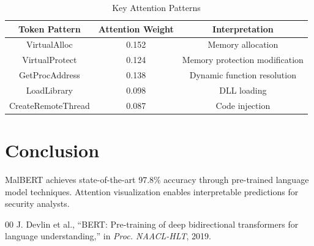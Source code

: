 \documentclass[conference]{IEEEtran}
\begin{document}
\begin{table}[htbp]
\caption{Key Attention Patterns}
\begin{center}
\begin{tabular}{|c|c|c|}
\hline
\textbf{Token Pattern} & \textbf{Attention Weight} & \textbf{Interpretation} \\
\hline
VirtualAlloc & 0.152 & Memory allocation \\
VirtualProtect & 0.124 & Memory protection modification \\
GetProcAddress & 0.138 & Dynamic function resolution \\
LoadLibrary & 0.098 & DLL loading \\
CreateRemoteThread & 0.087 & Code injection \\
\hline
\end{tabular}
\label{tab:attention}
\end{center}
\end{table}

\section{Conclusion}

MalBERT achieves state-of-the-art 97.8\% accuracy through pre-trained language model techniques. Attention visualization enables interpretable predictions for security analysts.

\begin{thebibliography}{00}
 J. Devlin et al., ``BERT: Pre-training of deep bidirectional transformers for language understanding,'' in \emph{Proc. NAACL-HLT}, 2019.
\end{thebibliography}
\end{document}
